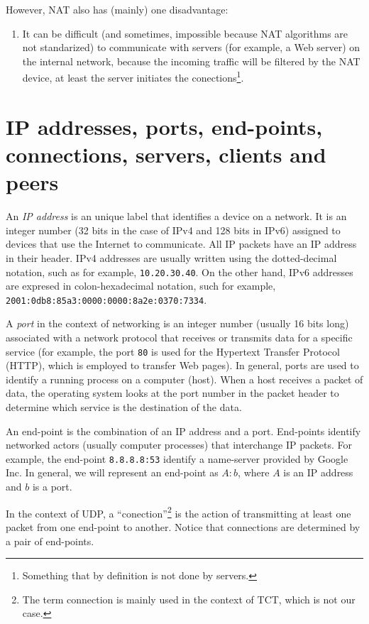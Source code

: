 However, NAT also has (mainly) one disadvantage:
\begin{enumerate}
\item It can be difficult (and sometimes, impossible because NAT
  algorithms are not standarized) to communicate with servers (for
  example, a Web server) on the internal network, because the incoming
  traffic will be filtered by the NAT device, at least the server
  initiates the conections\footnote{Something that by definition is
    not done by servers.}.
\end{enumerate}

\section{IP addresses, ports, end-points, connections, servers, clients and peers}

An \emph{IP address} is an unique label that identifies a device on a
network. It is an integer number (32 bits in the case of IPv4 and 128
bits in IPv6) assigned to devices that use the Internet to
communicate. All IP packets have an IP address in their header. IPv4
addresses are usually written using the dotted-decimal notation, such
as for example, \texttt{10.20.30.40}. On the other hand, IPv6
addresses are expresed in colon-hexadecimal notation, such for
example, \texttt{2001:0db8:85a3:0000:0000:8a2e:0370:7334}.

A \emph{port} in the context of networking is an integer number (usually 16
bits long) associated with a network protocol that receives or
transmits data for a specific service (for example, the port
\texttt{80} is used for the Hypertext Transfer Protocol (HTTP), which
is employed to transfer Web pages). In general, ports are used to
identify a running process on a computer (host). When a host receives
a packet of data, the operating system looks at the port number in the
packet header to determine which service is the destination of the
data.

An end-point is the combination of an IP address and a
port. End-points identify networked actors (usually computer
processes) that interchange IP packets. For example, the end-point
\texttt{8.8.8.8:53} identify a name-server provided by Google Inc. In
general, we will represent an end-point as $A:b$, where $A$ is an
IP address and $b$ is a port.

In the context of UDP, a ``conection''\footnote{The term connection is
  mainly used in the context of TCT, which is not our case.} is the
action of transmitting at least one packet from one end-point to
another. Notice that connections are determined by a pair of
end-points.

